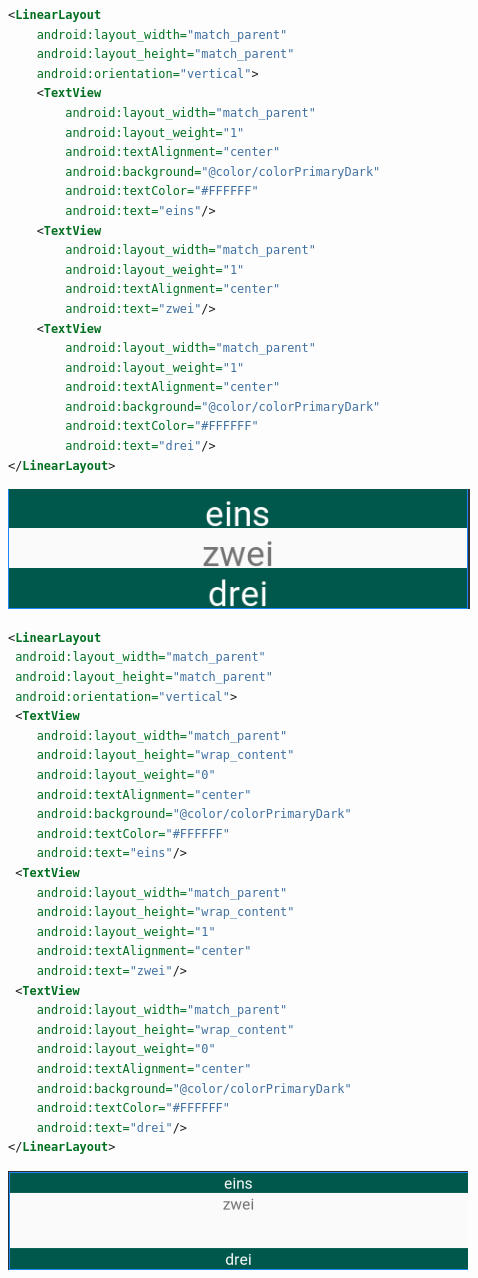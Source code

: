 \begin{lstlisting}[language=xml]
<LinearLayout 
    android:layout_width="match_parent"
    android:layout_height="match_parent"
    android:orientation="vertical">
    <TextView
        android:layout_width="match_parent"
        android:layout_weight="1"
        android:textAlignment="center"
        android:background="@color/colorPrimaryDark"
        android:textColor="#FFFFFF"
        android:text="eins"/>
    <TextView
        android:layout_width="match_parent"
        android:layout_weight="1"
        android:textAlignment="center"
        android:text="zwei"/>
    <TextView
        android:layout_width="match_parent"
        android:layout_weight="1"
        android:textAlignment="center"
        android:background="@color/colorPrimaryDark"
        android:textColor="#FFFFFF"
        android:text="drei"/>
</LinearLayout>
\end{lstlisting}
\includegraphics[scale=0.3]{img/linearlayout_2.png} 

\begin{lstlisting}[language=xml]
<LinearLayout 
 android:layout_width="match_parent"
 android:layout_height="match_parent"
 android:orientation="vertical">
 <TextView
    android:layout_width="match_parent"
    android:layout_height="wrap_content"
    android:layout_weight="0"
    android:textAlignment="center"
    android:background="@color/colorPrimaryDark"
    android:textColor="#FFFFFF"
    android:text="eins"/>
 <TextView
    android:layout_width="match_parent"
    android:layout_height="wrap_content"
    android:layout_weight="1"
    android:textAlignment="center"
    android:text="zwei"/>
 <TextView
    android:layout_width="match_parent"
    android:layout_height="wrap_content"
    android:layout_weight="0"
    android:textAlignment="center"
    android:background="@color/colorPrimaryDark"
    android:textColor="#FFFFFF"
    android:text="drei"/>
</LinearLayout>
\end{lstlisting}
\includegraphics[scale=0.3]{img/linearlayout_3.png} 

